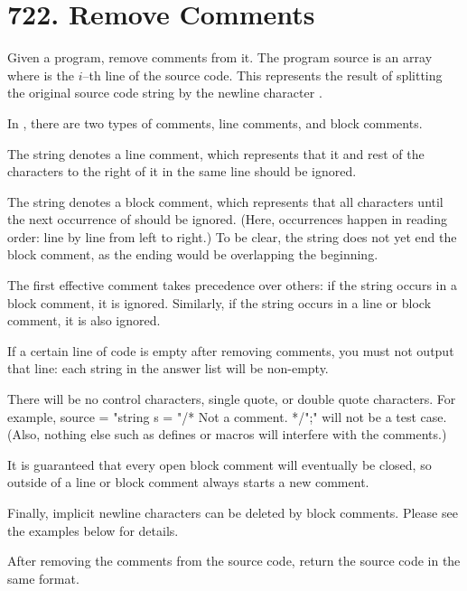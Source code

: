 \section{722. Remove Comments}
Given a  program, remove comments from it. The program source is an array where  is the $i$--th line of the source code. This represents the result of splitting the original source code string by the newline character \fcc{\n}.

In , there are two types of comments, line comments, and block comments.

The string \fcc{//} denotes a line comment, which represents that it and rest of the characters to the right of it in the same line should be ignored.

The string \fcc{/*} denotes a block comment, which represents that all characters until the next occurrence of \fcc{*/} should be ignored. (Here, occurrences happen in reading order: line by line from left to right.) To be clear, the string \fcc{/*/} does not yet end the block comment, as the ending would be overlapping the beginning.

The first effective comment takes precedence over others: if the string \fcc{//} occurs in a block comment, it is ignored. Similarly, if the string \fcc{/*} occurs in a line or block comment, it is also ignored.

If a certain line of code is empty after removing comments, you must not output that line: each string in the answer list will be non-empty.

There will be no control characters, single quote, or double quote characters. For example, source = "string s = "/* Not a comment. */";" will not be a test case. (Also, nothing else such as defines or macros will interfere with the comments.)

It is guaranteed that every open block comment will eventually be closed, so \fcc{/*} outside of a line or block comment always starts a new comment.

Finally, implicit newline characters can be deleted by block comments. Please see the examples below for details.

After removing the comments from the source code, return the source code in the same format.

